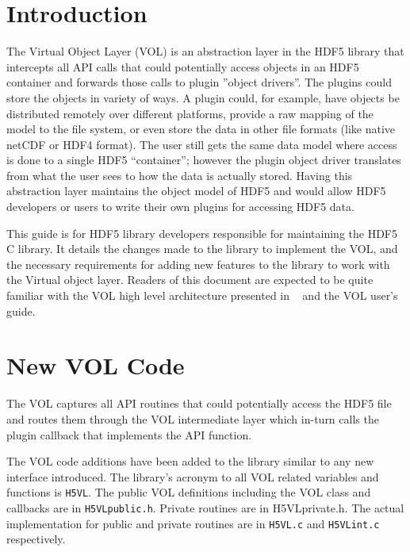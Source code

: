 

\section{Introduction}
The Virtual Object Layer (VOL) is an abstraction layer in the HDF5
library that intercepts all API calls that could potentially access
objects in an HDF5 container and forwards those calls to plugin
''object drivers''. The plugins could store the objects in variety of
ways. A plugin could, for example, have objects be distributed
remotely over different platforms, provide a raw mapping of the model
to the file system, or even store the data in other file formats (like
native netCDF or HDF4 format). The user still gets the same data model
where access is done to a single HDF5 “container”; however the plugin
object driver translates from what the user sees to how the data is
actually stored. Having this abstraction layer maintains the object
model of HDF5 and would allow HDF5 developers or users to write their
own plugins for accessing HDF5 data.

This guide is for HDF5 library developers responsible for maintaining the HDF5 C library. It details the changes made to the library to implement the VOL, and the necessary requirements for adding new features to the library to work with the Virtual object layer. Readers of this document are expected to be quite familiar with the VOL high level architecture presented in ~\cite{vol:rfc} and the VOL user's guide\cite{vol:ug}.

\section{New VOL Code}
The VOL captures all API routines that could potentially access the HDF5 file and routes them through the VOL intermediate layer which in-turn calls the plugin callback that implements the API function.

The VOL code additions have been added to the library similar to any new interface introduced. The library's acronym to all VOL related variables and functions is {\tt H5VL}. The public VOL definitions including the VOL class and callbacks are in {\tt H5VLpublic.h}. Private routines are in {H5VLprivate.h}. The actual implementation for public and private routines are in {\tt H5VL.c} and {\tt H5VLint.c} respectively.

